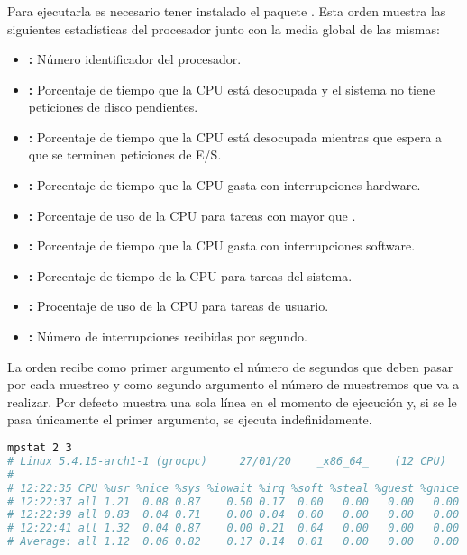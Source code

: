 \subsubsection{}

Para ejecutarla es necesario tener instalado el paquete .
Esta orden muestra las siguientes estadísticas del procesador junto con la media global de las mismas:

\begin{itemize}
	\item{}\textbf{:} Número identificador del procesador.
	\item{}\textbf{:} Porcentaje de tiempo que la CPU está desocupada y el sistema no tiene peticiones de disco pendientes.
	\item{}\textbf{:} Porcentaje de tiempo que la CPU está desocupada mientras que espera a que se terminen peticiones de E/S.
	\item{}\textbf{:} Porcentaje de tiempo que la CPU gasta con interrupciones hardware.
	\item{}\textbf{:} Porcentaje de uso de la CPU para tareas con  mayor que .
	\item{}\textbf{:} Porcentaje de tiempo que la CPU gasta con interrupciones software.
	\item{}\textbf{:} Porcentaje de tiempo de la CPU para tareas del sistema.
	\item{}\textbf{:} Procentaje de uso de la CPU para tareas de usuario.
	\item{}\textbf{:} Número de interrupciones recibidas por segundo.
\end{itemize}

La orden recibe como primer argumento el número de segundos que deben pasar por cada muestreo y como segundo argumento el número de muestremos que va a realizar.
Por defecto muestra una sola línea en el momento de ejecución y, si se le pasa únicamente el primer argumento, se ejecuta indefinidamente.

\begin{lstlisting}[language=Bash]
mpstat 2 3
# Linux 5.4.15-arch1-1 (grocpc) 	27/01/20 	_x86_64_	(12 CPU)
#
# 12:22:35 CPU %usr %nice %sys %iowait %irq %soft %steal %guest %gnice %idle
# 12:22:37 all 1.21  0.08 0.87    0.50 0.17  0.00   0.00   0.00   0.00 97.17
# 12:22:39 all 0.83  0.04 0.71    0.00 0.04  0.00   0.00   0.00   0.00 98.38
# 12:22:41 all 1.32  0.04 0.87    0.00 0.21  0.04   0.00   0.00   0.00 97.52
# Average: all 1.12  0.06 0.82    0.17 0.14  0.01   0.00   0.00   0.00 97.69
\end{lstlisting}

